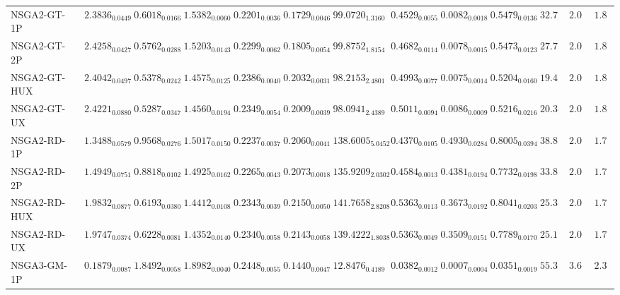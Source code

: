 \documentclass[11pt,a4paper]{article}
\begin{document}
\begin{table}[H]
{\begin{tabular}{lcccccccccccc}
NSGA2-GT-1P & $\mathbf{2.3836}_{0.0449}$ & $\mathbf{0.6018}_{0.0166}$ & $1.5382_{0.0060}$ & $0.2201_{0.0036}$ & $0.1729_{0.0046}$ & $99.0720_{1.3160}$ & $0.4529_{0.0055}$ & $0.0082_{0.0018}$ & $0.5479_{0.0136}$ & $32.78$ & $\mathbf{2.00}$ & $1.89$ \\
NSGA2-GT-2P & $\mathbf{2.4258}_{0.0427}$ & $\mathbf{0.5762}_{0.0288}$ & $1.5203_{0.0143}$ & $0.2299_{0.0062}$ & $0.1805_{0.0054}$ & $99.8752_{1.8154}$ & $0.4682_{0.0114}$ & $0.0078_{0.0015}$ & $0.5473_{0.0123}$ & $27.78$ & $\mathbf{2.00}$ & $1.89$ \\
NSGA2-GT-HUX & $\mathbf{2.4042}_{0.0497}$ & $\mathbf{0.5378}_{0.0242}$ & $1.4575_{0.0125}$ & $0.2386_{0.0040}$ & $0.2032_{0.0031}$ & $98.2153_{2.4801}$ & $\mathbf{0.4993}_{0.0077}$ & $0.0075_{0.0014}$ & $0.5204_{0.0160}$ & $\mathbf{19.44}$ & $\mathbf{2.00}$ & $1.89$ \\
NSGA2-GT-UX & $\mathbf{2.4221}_{0.0880}$ & $\mathbf{0.5287}_{0.0347}$ & $1.4560_{0.0194}$ & $0.2349_{0.0054}$ & $0.2009_{0.0039}$ & $98.0941_{2.4389}$ & $\mathbf{0.5011}_{0.0094}$ & $0.0086_{0.0009}$ & $0.5216_{0.0216}$ & $\mathbf{20.33}$ & $\mathbf{2.00}$ & $1.89$ \\
NSGA2-RD-1P & $1.3488_{0.0579}$ & $0.9568_{0.0276}$ & $1.5017_{0.0150}$ & $0.2237_{0.0037}$ & $0.2060_{0.0041}$ & $138.6005_{5.0452}$ & $0.4370_{0.0105}$ & $0.4930_{0.0284}$ & $0.8005_{0.0394}$ & $38.89$ & $\mathbf{2.00}$ & $\mathbf{1.78}$ \\
NSGA2-RD-2P & $1.4949_{0.0751}$ & $0.8818_{0.0102}$ & $1.4925_{0.0162}$ & $0.2265_{0.0043}$ & $0.2073_{0.0018}$ & $135.9209_{2.0302}$ & $0.4584_{0.0013}$ & $0.4381_{0.0194}$ & $0.7732_{0.0198}$ & $33.89$ & $\mathbf{2.00}$ & $\mathbf{1.78}$ \\
NSGA2-RD-HUX & $1.9832_{0.0877}$ & $\mathbf{0.6193}_{0.0380}$ & $1.4412_{0.0108}$ & $0.2343_{0.0039}$ & $0.2150_{0.0050}$ & $141.7658_{2.8208}$ & $\mathbf{0.5363}_{0.0113}$ & $0.3673_{0.0192}$ & $0.8041_{0.0203}$ & $\mathbf{25.33}$ & $\mathbf{2.00}$ & $\mathbf{1.78}$ \\
NSGA2-RD-UX & $1.9747_{0.0374}$ & $0.6228_{0.0081}$ & $1.4352_{0.0140}$ & $0.2340_{0.0058}$ & $0.2143_{0.0058}$ & $139.4222_{1.8038}$ & $\mathbf{0.5363}_{0.0049}$ & $0.3509_{0.0151}$ & $0.7789_{0.0170}$ & $\mathbf{25.11}$ & $\mathbf{2.00}$ & $\mathbf{1.78}$ \\
NSGA3-GM-1P & $0.1879_{0.0087}$ & $1.8492_{0.0058}$ & $1.8982_{0.0040}$ & $0.2448_{0.0055}$ & $0.1440_{0.0047}$ & $12.8476_{0.4189}$ & $0.0382_{0.0012}$ & $0.0007_{0.0004}$ & $\mathbf{0.0351}_{0.0019}$ & $55.33$ & $3.67$ & $2.33$ \\

\end{tabular}}
\end{table}
\end{document}
